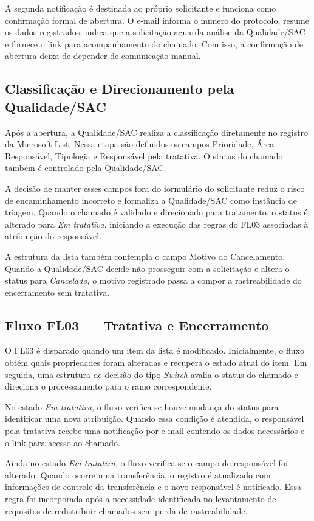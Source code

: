 A segunda notificação é destinada ao próprio solicitante e
funciona como confirmação formal de abertura. O e-mail
informa o número do protocolo, resume os dados registrados,
indica que a solicitação aguarda análise da Qualidade/SAC e
fornece o link para acompanhamento do chamado. Com isso, a
confirmação de abertura deixa de depender de comunicação
manual.

\subsection{Classificação e Direcionamento pela
Qualidade/SAC}

Após a abertura, a Qualidade/SAC realiza a classificação
diretamente no registro da Microsoft List. Nessa etapa são
definidos os campos Prioridade, Área Responsável, Tipologia
e Responsável pela tratativa. O status do chamado também é
controlado pela Qualidade/SAC.

A decisão de manter esses campos fora do formulário do
solicitante reduz o risco de encaminhamento incorreto e
formaliza a Qualidade/SAC como instância de triagem. Quando
o chamado é validado e direcionado para tratamento, o
status é alterado para \textit{Em tratativa}, iniciando a
execução das regras do FL03 associadas à atribuição do
responsável.

A estrutura da lista também contempla o campo Motivo do
Cancelamento. Quando a Qualidade/SAC decide não prosseguir
com a solicitação e altera o status para
\textit{Cancelado}, o motivo registrado passa a compor a
rastreabilidade do encerramento sem tratativa.

\subsection{Fluxo FL03 --- Tratativa e Encerramento}

O FL03 é disparado quando um item da lista é modificado.
Inicialmente, o fluxo obtém quais propriedades foram
alteradas e recupera o estado atual do item. Em seguida,
uma estrutura de decisão do tipo \textit{Switch} avalia o
status do chamado e direciona o processamento para o ramo
correspondente.

No estado \textit{Em tratativa}, o fluxo verifica se houve
mudança do status para identificar uma nova atribuição.
Quando essa condição é atendida, o responsável pela
tratativa recebe uma notificação por e-mail contendo os
dados necessários e o link para acesso ao chamado.

Ainda no estado \textit{Em tratativa}, o fluxo verifica se
o campo de responsável foi alterado. Quando ocorre uma
transferência, o registro é atualizado com informações de
controle da transferência e o novo responsável é
notificado. Essa regra foi incorporada após a necessidade
identificada no levantamento de requisitos de redistribuir
chamados sem perda de rastreabilidade.

